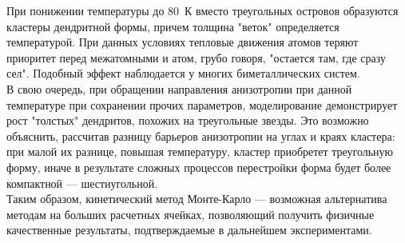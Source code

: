 \documentclass[12pt]{article}
\begin{document}
При понижении температуры до 80~К вместо треугольных островов образуются кластеры дендритной формы, причем толщина "веток" определяется температурой. При данных условиях тепловые движения атомов теряют приоритет перед межатомными и атом, грубо говоря, "остается там, где сразу сел". Подобный эффект наблюдается у многих биметаллических систем. \\

В свою очередь, при обращении направления анизотропии при данной температуре при сохранении прочих параметров, моделирование демонстрирует рост "толстых" дендритов, похожих на треугольные звезды. Это возможно объяснить, рассчитав разницу барьеров анизотропии на углах и краях кластера: при малой их разнице, повышая температуру, кластер приобретет треугольную форму, иначе в результате сложных процессов перестройки форма будет более компактной --- шестиугольной. \\

Таким образом, кинетический метод Монте-Карло --- возможная альтернатива методам  на больших расчетных ячейках, позволяющий получить физичные качественные результаты, подтверждаемые в дальнейшем экспериментами.
\end{document}
